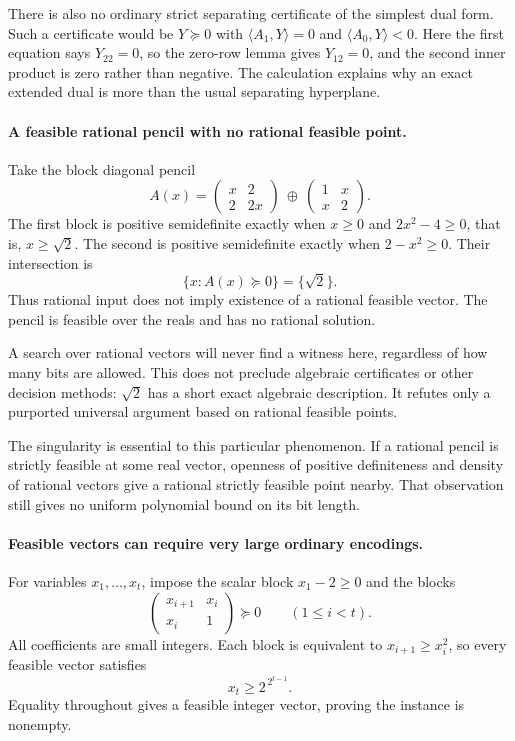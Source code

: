\documentclass[11pt]{article}
\begin{document}
There is also no ordinary strict separating certificate of the simplest dual form. Such a certificate would be $Y\succeq0$ with
$\langle A_1,Y\rangle=0$ and $\langle A_0,Y\rangle<0$. Here the first equation says $Y_{22}=0$, so the zero-row lemma gives $Y_{12}=0$, and the second inner product is zero rather than negative. The calculation explains why an exact extended dual is more than the usual separating hyperplane.

\paragraph{A feasible rational pencil with no rational feasible point.}
Take the block diagonal pencil
\[
 A(x)=
 \begin{pmatrix}x&2\\2&2x\end{pmatrix}
 \ \oplus\
 \begin{pmatrix}1&x\\x&2\end{pmatrix}.
 \tag{269.2}
\]
The first block is positive semidefinite exactly when $x\ge0$ and
$2x^2-4\ge0$, that is, $x\ge\sqrt2$. The second is positive semidefinite exactly when $2-x^2\ge0$. Their intersection is
\[
 \{x:A(x)\succeq0\}=\{\sqrt2\}.
\]
Thus rational input does not imply existence of a rational feasible vector. The pencil is feasible over the reals and has no rational solution.

A search over rational vectors will never find a witness here, regardless of how many bits are allowed. This does not preclude algebraic certificates or other decision methods: $\sqrt2$ has a short exact algebraic description. It refutes only a purported universal argument based on rational feasible points.

The singularity is essential to this particular phenomenon. If a rational pencil is strictly feasible at some real vector, openness of positive definiteness and density of rational vectors give a rational strictly feasible point nearby. That observation still gives no uniform polynomial bound on its bit length.

\paragraph{Feasible vectors can require very large ordinary encodings.}
For variables $x_1,\ldots,x_t$, impose the scalar block $x_1-2\ge0$ and the blocks
\[
 \begin{pmatrix}x_{i+1}&x_i\\x_i&1\end{pmatrix}\succeq0
 \qquad(1\le i<t).
 \tag{269.3}
\]
All coefficients are small integers. Each block is equivalent to
$x_{i+1}\ge x_i^2$, so every feasible vector satisfies
\[
 x_t\ge 2^{\,2^{t-1}}.
\]
Equality throughout gives a feasible integer vector, proving the instance is nonempty.
\end{document}
